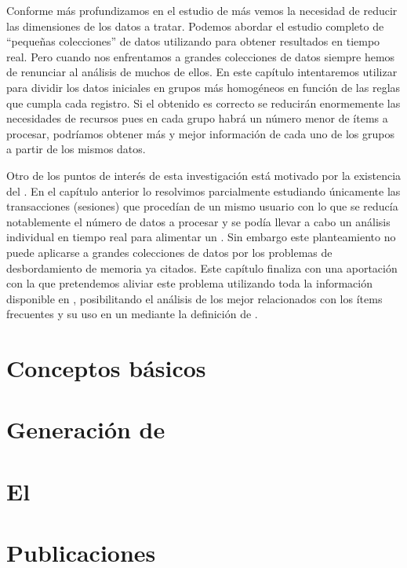 Conforme más profundizamos en el estudio de \ARs más vemos la necesidad de reducir las dimensiones de los datos a tratar. Podemos abordar el estudio completo de "`pequeñas colecciones"' de datos utilizando \apriori para obtener resultados en tiempo real. Pero cuando nos enfrentamos a grandes colecciones de datos siempre hemos de renunciar al análisis de muchos de ellos. En este capítulo intentaremos utilizar \apriori para dividir los datos iniciales en grupos más homogéneos en función de las reglas que cumpla cada registro. Si el \clustering obtenido es correcto se reducirán enormemente las necesidades de recursos pues en cada grupo habrá un número menor de ítems a procesar, podríamos obtener más y mejor información de cada uno de los grupos a partir de los mismos datos.

Otro de los puntos de interés de esta investigación está motivado por la existencia del \dilemaIR. En el capítulo anterior lo resolvimos parcialmente estudiando únicamente las transacciones (sesiones) que procedían de un mismo usuario con lo que se reducía notablemente el número de datos a procesar y se podía llevar a cabo un análisis individual en tiempo real para alimentar un \SRW. Sin embargo este planteamiento no puede aplicarse a grandes colecciones de datos por los problemas de desbordamiento de memoria ya citados. Este capítulo finaliza con una aportación con la que pretendemos aliviar este problema utilizando toda la información disponible en \D, posibilitando el análisis de los \irs mejor relacionados con los ítems frecuentes y su uso en un \SR mediante la definición de \ROPs.




\section{Conceptos básicos}
\label{sec:arm:conceptos-basicos}





\section{\fim}
\label{sec:arm:fim}





\section{Generación de \ars}
\label{sec:arm:generacion-ar}





\section{El \IR}
\label{sec:arm:el-item-raro}





\section{Publicaciones}
\label{sec:arm:publicaciones}

